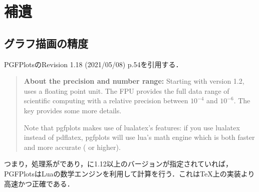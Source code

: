 \documentclass[../../index]{subfiles}
\begin{document}
\section{補遺}
\subsection{グラフ描画の精度}
PGFPlotsのRevision 1.18 (2021/05/08) p.54を引用する．

\begin{quotation}
  \textbf{About the precision and number range:} Starting with version 1.2,  uses
  a floating point unit. The FPU provides the full data range of scientific computing with a relative
  precision between $10^{-4}$ and $10^{-6}$. The  key provides some more details.

  Note that pgfplots makes use of lualatex's features: if you use lualatex instead of pdflatex,
  pgfplots will use lua's math engine which is both faster and more accurate ( or higher).
\end{quotation}

つまり，処理系が\LuaLaTeX であり，に1.12以上のバージョンが指定されていれば，
PGFPlotsはLuaの数学エンジンを利用して計算を行う．これは\TeX 上の実装より高速かつ正確である．
\end{document}
